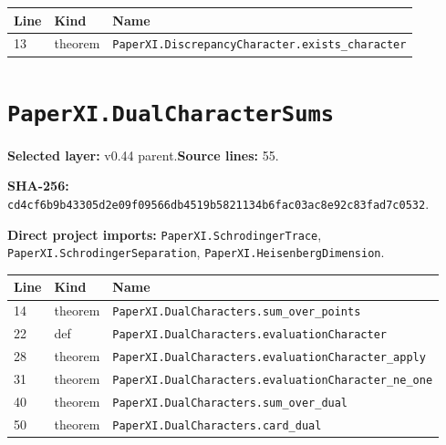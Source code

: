 \documentclass[10pt,oneside]{book}
\begin{document}
\begin{longtable}{@{}p{}p{}p{}@{}}\toprule Line&Kind&Name\\\midrule\endhead

13&theorem&\nolinkurl{PaperXI.DiscrepancyCharacter.exists_character}\\

\bottomrule\end{longtable}

\section{\texorpdfstring{\nolinkurl{PaperXI.DualCharacterSums}}{PaperXI.DualCharacterSums}}\label{module:PaperXI.DualCharacterSums}

\textbf{Selected layer:} v0.44 parent.\quad\textbf{Source lines:} 55.\par\textbf{SHA-256:} {\scriptsize\nolinkurl{cd4cf6b9b43305d2e09f09566db4519b5821134b6fac03ac8e92c83fad7c0532}}.


\textbf{Direct project imports:} \nolinkurl{PaperXI.SchrodingerTrace}, \nolinkurl{PaperXI.SchrodingerSeparation}, \nolinkurl{PaperXI.HeisenbergDimension}.

\begin{longtable}{@{}p{}p{}p{}@{}}\toprule Line&Kind&Name\\\midrule\endhead

14&theorem&\nolinkurl{PaperXI.DualCharacters.sum_over_points}\\

22&def&\nolinkurl{PaperXI.DualCharacters.evaluationCharacter}\\

28&theorem&\nolinkurl{PaperXI.DualCharacters.evaluationCharacter_apply}\\

31&theorem&\nolinkurl{PaperXI.DualCharacters.evaluationCharacter_ne_one}\\

40&theorem&\nolinkurl{PaperXI.DualCharacters.sum_over_dual}\\

50&theorem&\nolinkurl{PaperXI.DualCharacters.card_dual}\\

\bottomrule\end{longtable}
\end{document}
